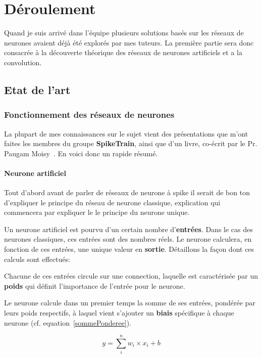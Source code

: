 \hypertarget{Deroulement}{%
\chapter{Déroulement}\label{Déroulement}}

Quand je suis arrivé dans l'équipe plusieurs solutions basés sur les réseaux de neurones avaient déjà été explorés par mes tuteurs.
La première partie sera donc consacrée à la découverte théorique des réseaux de neurones artificiels et a la convolution.
\hypertarget{Etat de l art}{%
\section{Etat de l'art}
\subsection{Fonctionnement des réseaux de neurones}
La plupart de mes connaissances sur le sujet vient des présentations que m'ont faites les membres du groupe \textbf{SpikeTrain}, ainsi que d'un livre, co-écrit par le Pr. Paugam Moisy~\cite{naturalHandbook}.
En voici donc un rapide résumé.

\subsubsection{Neurone artificiel}
\label{neuroneClassique}
Tout d'abord avant de parler de réseaux de neurone à spike il serait de bon ton d'expliquer le principe du réseau de neurone classique, explication qui commencera par expliquer le
le principe du neurone unique.

Un neurone artificiel est pourvu d'un certain nombre d'\textbf{entrées}. Dans le cas des neurones classiques, ces entrées sont des nombres réels. Le neurone calculera, en fonction de ces entrées, une unique valeur en \textbf{sortie}.
Détaillons la façon dont ces calculs sont effectués:

Chacune de ces entrées circule sur une connection, laquelle est caractérisée par un \textbf{poids} qui définit l'importance de l'entrée pour le neurone.

Le neurone calcule dans un premier temps la somme de ses entrées, pondérée par leurs poids respectifs, à laquel vient s'ajouter un \textbf{biais} spécifique à chaque neurone (cf. equation~\ref{sommePonderee}).

\begin{equation}
\label{sommePonderee}
y = \sum_{i}^{n} w_i \times x_i + b
\end{equation}

}
